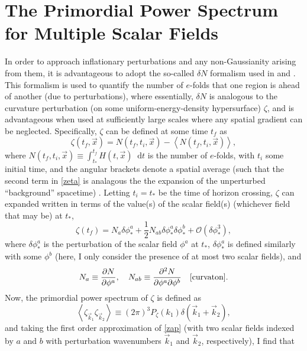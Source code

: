 \documentclass[12pt]{article}
\newcommand*\diff{\mathop{}\!\mathrm{d}}
\begin{document}
\section{The Primordial Power Spectrum for Multiple Scalar Fields}
\par In order to approach inflationary perturbations and any non-Gaussianity arising from them, it is advantageous to adopt the so-called $\delta N$ formalism used in \cite{curvaton} and \cite{modul}. This formalism is used to quantify the number of $e$-folds that one region is ahead of another (due to perturbations), where essentially, $\delta N$ is analogous to the curvature perturbation (on some uniform-energy-density hypersurface) $\zeta$, and is advantageous when used at sufficiently large scales where any spatial gradient can be neglected. Specifically, $\zeta$ can be defined at some time $t_f$ as
\begin{equation}\label{zeta}
    \zeta(t_f,\vec{x})=N(t_f,t_i,\vec{x}) - \left<N(t_f,t_i,\vec{x})\right>,
\end{equation}
where $N(t_f,t_i,\vec{x})\equiv\displaystyle\int_{t_*}^{t_f}H(t,\vec{x})\diff t$ is the number of $e$-folds, with $t_i$ some initial time, and the angular brackets denote a spatial average (such that the second term in \eqref{zeta} is analagous the the expansion of the unperturbed ``background'' spacetime) \cite{curvaton}\cite{modul}. Letting $t_i=t_*$ be the time of horizon crossing, $\zeta$ can expanded written in terms of the value(s) of the scalar field(s) (whichever field that may be) at $t_*$,
\begin{equation}\label{zap}
    \zeta(t_f)=N_a\delta\phi^a_* + \frac{1}{2}N_{ab}\delta\phi^a_*\delta\phi^b_* + \mathcal{O}(\delta\phi_*^3),
\end{equation}
where $\delta\phi_*^a$ is the perturbation of the scalar field $\phi^a$ at $t_*$, $\delta\phi_*^a$ is defined similarly with some $\phi^b$ (here, I only consider the presence of at most two scalar fields), and
\begin{equation}
N_a\equiv\pdv{N}{\phi^a}, \quad N_{ab}\equiv\pdv[2]{N}{\phi^a}{\phi^b}\quad\text{\cite{curvaton}}.
\end{equation}
Now, the primordial power spectrum of $\zeta$ is defined as
\begin{equation} \label{PwrDef}
    \left<\zeta_{\vec{k}_1}\zeta_{\vec{k}_2}\right>\equiv(2\pi)^3P_\zeta(k_1)\delta(\vec{k}_1+\vec{k}_2),
\end{equation}
and taking the first order approximation of \eqref{zap} (with two scalar fields indexed by $a$ and $b$ with perturbation wavenumbers $\vec{k}_1$ and $\vec{k}_2$, respectively), I find that
\end{document}
